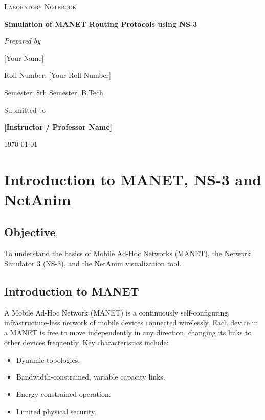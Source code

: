 \documentclass[12pt,a4paper]{report}
\begin{document}
\begin{titlepage}
    \centering
    \vspace*{2cm}
    
    {\scshape\LARGE Laboratory Notebook \par}
    \vspace{1.5cm}
    {\huge\bfseries Simulation of MANET Routing Protocols using NS-3\par}
    \vspace{2cm}
    
    {\Large\itshape Prepared by \par}
    \vspace{0.5cm}
    {\Large [Your Name] \par}
    {\large Roll Number: [Your Roll Number] \par}
    {\large Semester: 8th Semester, B.Tech \par}
    
    \vfill
    
    {\large Submitted to \par}
    {\Large \textbf{[Instructor / Professor Name]} \par}
    
    \vspace{2cm}
    {\large \today\par}
\end{titlepage}

\tableofcontents
\listoffigures
\listoftables
\clearpage

\chapter{Introduction to MANET, NS-3 and NetAnim}

\section{Objective}
To understand the basics of Mobile Ad-Hoc Networks (MANET), the Network Simulator 3 (NS-3), and the NetAnim visualization tool.

\section{Introduction to MANET}
A Mobile Ad-Hoc Network (MANET) is a continuously self-configuring, infrastructure-less network of mobile devices connected wirelessly. Each device in a MANET is free to move independently in any direction, changing its links to other devices frequently. 
Key characteristics include:
\begin{itemize}
    \item Dynamic topologies.
    \item Bandwidth-constrained, variable capacity links.
    \item Energy-constrained operation.
    \item Limited physical security.
\end{itemize}
\end{document}
